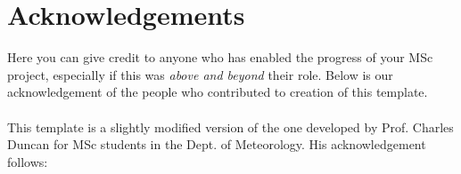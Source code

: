 \documentclass[12pt,a4paper,notitlepage]{report}
\begin{document}
\begin{abstract} 
\thispagestyle{plain}
\noindent This is the bit where you summarise what is in your thesis. A non-expert reader 
should be able to understand the area of your work, what the main challenges 
were and what contributions or insights you've achieved, and gauge whether 
this work is relevant to their interests,. Think of the abstract as 
a super-concentrated summary of your MSc project; advertise your work 
but try to avoid cliffhangers.

A good abstract fits to 1 to 2 paragraphs and takes around 200 words to get your 
point across. To give you an idea, this abstract is 97 words long.
\end{abstract}


%
\tableofcontents
\listoftables
\listoffigures

\newpage

\vspace*{2in}

\section*{Acknowledgements}

Here you can give credit to anyone who has enabled the progress of your MSc 
project, especially if this was \emph{above and beyond} their role. Below is 
our acknowledgement of the people who contributed to creation of this template. 
\\ \\
%
This template is a slightly modified version of the one developed by
Prof. Charles Duncan for MSc students in the Dept. of Meteorology. His
acknowledgement follows:
\end{document}
